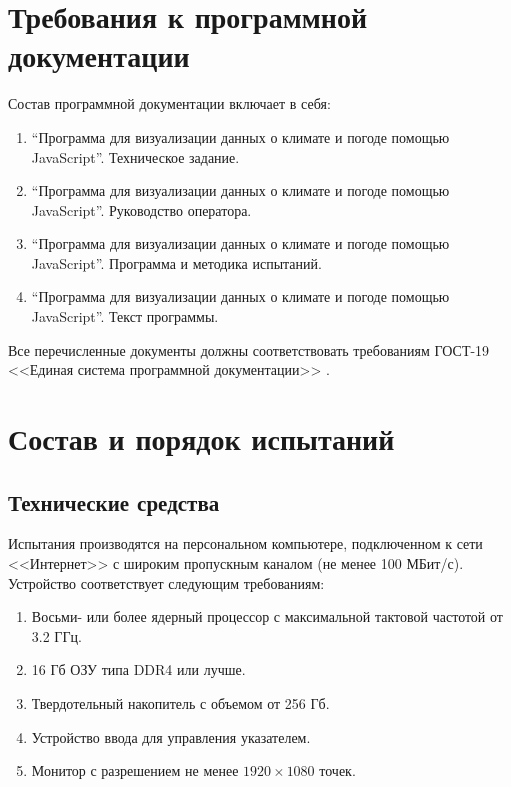 \documentclass[a4paper, 12pt]{article}
\begin{document}
	\section{Требования к программной документации}
	Состав программной документации включает в себя:
	\begin{enumerate}
		\item \enquote{Программа для визуализации данных о климате и погоде помощью JavaScript}. Техническое задание.

		\item \enquote{Программа для визуализации данных о климате и погоде помощью JavaScript}. Руководство оператора.

		\item \enquote{Программа для визуализации данных о климате и погоде помощью JavaScript}. Программа и методика испытаний.

		\item \enquote{Программа для визуализации данных о климате и погоде помощью JavaScript}. Текст программы.
	\end{enumerate}

	Все перечисленные документы должны соответствовать требованиям ГОСТ-19 <<Единая система программной документации>> \cite{ESPD}.

	\section{Состав и порядок испытаний}
	\subsection{Технические средства}
	Испытания производятся на персональном компьютере, подключенном к сети <<Интернет>> с широким пропускным каналом (не менее
	100 МБит/с). Устройство соответствует следующим требованиям:
	\begin{enumerate}
		\item Восьми- или более ядерный процессор с максимальной тактовой частотой от 3.2 ГГц.

		\item 16 Гб ОЗУ типа DDR4 или лучше.

		\item Твердотельный накопитель с объемом от 256 Гб.

		\item Устройство ввода для управления указателем.

		\item Монитор с разрешением не менее $1920\times 1080$ точек.
	\end{enumerate}
\end{document}
